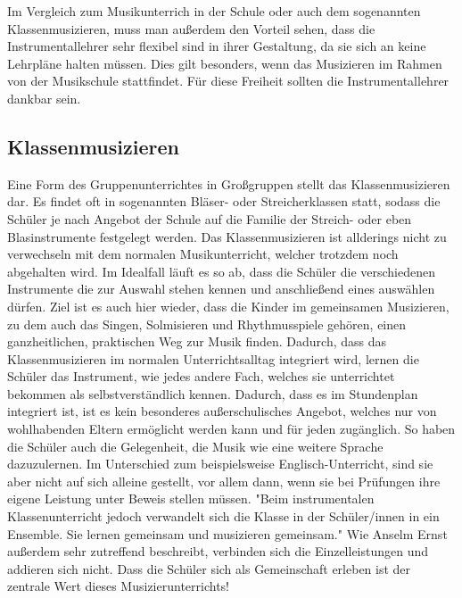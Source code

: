 Im Vergleich zum Musikunterrich in der Schule oder auch dem sogenannten
Klassenmusizieren, muss man außerdem den Vorteil sehen, dass die
Instrumentallehrer sehr flexibel sind in ihrer Gestaltung, da sie sich an keine
Lehrpläne halten müssen. Dies gilt besonders, wenn das Musizieren im Rahmen von
der Musikschule stattfindet. Für diese Freiheit sollten die Instrumentallehrer
dankbar sein.



\subsection{Klassenmusizieren}
Eine Form des Gruppenunterrichtes in Großgruppen stellt das Klassenmusizieren
dar. Es findet oft in sogenannten Bläser- oder Streicherklassen statt, sodass
die Schüler je nach Angebot der Schule auf die Familie der Streich- oder eben
Blasinstrumente festgelegt werden. Das Klassenmusizieren ist allderings nicht zu
verwechseln mit dem normalen Musikunterricht, welcher trotzdem noch abgehalten
wird. Im Idealfall läuft es so ab, dass die Schüler die verschiedenen
Instrumente die zur Auswahl stehen kennen und anschließend eines auswählen
dürfen. Ziel ist es auch hier wieder, dass die Kinder im gemeinsamen Musizieren,
zu dem auch das Singen, Solmisieren und Rhythmusspiele gehören, einen
ganzheitlichen, praktischen Weg zur Musik finden.
\autocite[91]{ernst:die_zukunftsfaehige_musikschule} Dadurch, dass das
Klassenmusizieren im normalen Unterrichtsalltag integriert wird, lernen die
Schüler das Instrument, wie jedes andere Fach, welches sie unterrichtet bekommen
als selbstverständlich kennen. Dadurch, dass es im Stundenplan integriert ist,
ist es kein besonderes außerschulisches Angebot, welches nur von wohlhabenden
Eltern ermöglicht werden kann und für jeden zugänglich. So haben die Schüler
auch die Gelegenheit, die Musik wie eine weitere Sprache dazuzulernen. Im
Unterschied zum beispielsweise Englisch-Unterricht, sind sie aber nicht auf sich
alleine gestellt, vor allem dann, wenn sie bei Prüfungen ihre eigene Leistung
unter Beweis stellen müssen. "Beim instrumentalen Klassenunterricht jedoch
verwandelt sich die Klasse in der Schüler/innen in ein Ensemble. Sie lernen
gemeinsam und musizieren gemeinsam."
\autocite[92]{ernst:die_zukunftsfaehige_musikschule} Wie Anselm Ernst außerdem
sehr zutreffend beschreibt, verbinden sich die Einzelleistungen und addieren
sich nicht. Dass die Schüler sich als Gemeinschaft erleben ist der zentrale Wert
dieses Musizierunterrichts!


